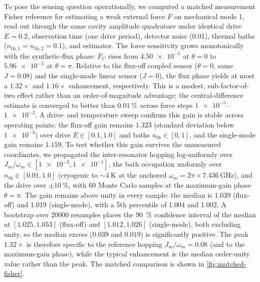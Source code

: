 \documentclass[aip,cha,reprint]{revtex4-2}
\begin{document}
To pose the sensing question operationally, we computed a matched measurement
Fisher reference for estimating a weak external force $F$ on mechanical mode
$1$, read out through the same cavity amplitude quadrature under identical drive
$E=\num{0.2}$, observation time (one drive period), detector noise (\num{0.01}),
thermal baths ($n_{\mathrm{th},1}=n_{\mathrm{th},2}=\num{0.1}$), and estimator.
The force sensitivity grows monotonically with the synthetic-flux phase: $F_C$
rises from $\num{4.50e-5}$ at $\theta=0$ to $\num{5.96e-5}$ at
$\theta=\pi$. Relative to the flux-off coupled sensor ($\theta=0$, same
$J=\num{0.08}$) and the single-mode linear sensor ($J=0$), the flux phase yields
at most a $1.32\times$ and $1.16\times$ enhancement, respectively.
This is a modest, sub-factor-of-two effect rather than an order-of-magnitude
advantage; the central-difference estimate is converged to better than
$\SI{0.01}{\percent}$ across force steps $\num{1e-5}$--$\num{1e-3}$. A drive- and
temperature sweep confirms this gain is stable across operating points: the
flux-off gain remains $\num{1.323}$ (standard deviation below $\num{1e-3}$)
over drive $E\in[\num{0.1},\num{1.0}]$ and baths $n_{\mathrm{th}}\in[0,1]$, and
the single-mode gain remains $\num{1.159}$. To test whether this gain survives
the unmeasured coordinates, we propagated the inter-resonator hopping
log-uniformly over $J_m/\omega_m\in[\num{1e-3},\num{1e-1}]$, the bath occupation
uniformly over $n_{\mathrm{th}}\in[\num{0.01},\num{1.0}]$ (cryogenic to
$\sim\num{4}~\si{\kelvin}$ at the anchored $\omega_m=2\pi\times\num{7.436}~\si{\giga\hertz}$), and the
drive over $\pm\SI{10}{\percent}$, with \num{60} Monte Carlo samples at the
maximum-gain phase $\theta=\pi$. The gain remains above unity in every sample:
the median is \num{1.039} (flux-off) and \num{1.019} (single-mode), with a
\num{5}th percentile of \num{1.004} and \num{1.002}. A bootstrap over
\num{20000} resamples places the \SI{90}{\percent} confidence interval of the
median at $[\num{1.025},\num{1.053}]$ (flux-off) and
$[\num{1.012},\num{1.026}]$ (single-mode), both excluding unity, so the median
excess ($\num{0.039}$ and $\num{0.019}$) is significantly positive. The peak
$\num{1.32}\times$ is therefore specific to the reference hopping
$J_m/\omega_m=\num{0.08}$ (and to the maximum-gain phase), while the typical
enhancement is the median order-unity value rather than the peak. The
matched comparison is shown in \cref{fig:matched-fisher}.
\end{document}
